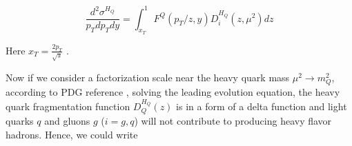 \begin{equation}
\frac{d^2\sigma^{H_Q}}{p_T dp_T dy} = \int_{x_T}^1 F^Q(p_T/z, y) D_{i}^{H_Q}(z,\mu^2) dz
\end{equation}

Here $x_T = \frac{2p_T}{\sqrt s}$ \cite{HadronScale}.

Now if we consider a factorization scale near the heavy quark mass $\mu^2 \rightarrow m_Q^2$, according to PDG reference \cite{AlphaTheoEx}, solving the leading evolution equation, the heavy quark fragmentation function $D_Q^{H_Q}(z)$ is in a form of a delta function and light quarks $q$ and gluons $g$ ($i = g, q$) will not contribute to producing heavy flavor hadrons. Hence, we could write

